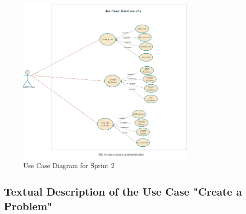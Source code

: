 \begin{figure}[h!]
    \centering*
    \includegraphics[width=0.8\textwidth]{images/use-case3.png}
    \caption{Use Case Diagram for Sprint 2}
    \label{fig:Use Case Diagram for Sprint 2}
\end{figure}
\newpage
\subsection{Textual Description of the Use Case "Create a Problem"}

